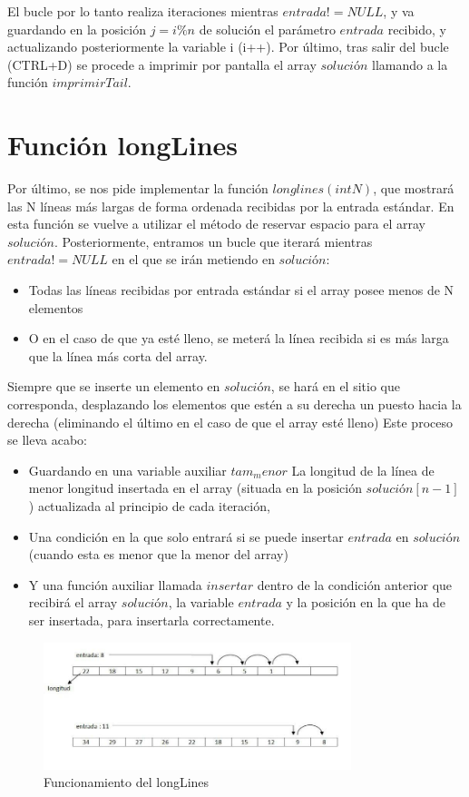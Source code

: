 El bucle por lo tanto realiza iteraciones mientras $entrada != NULL$, y va guardando en la posición $j=i\%n$ de solución el parámetro $entrada$ recibido, y actualizando posteriormente la variable i (i++).
Por último, tras salir del bucle (CTRL+D) se procede a imprimir por pantalla el array $solución$ llamando a la función $imprimirTail$.
\section{Función longLines}
Por último, se nos pide implementar la función $longlines(int N)$, que mostrará las N líneas más largas de forma ordenada recibidas por la entrada estándar.
En esta función se vuelve a utilizar el método de reservar espacio para el array $solución$. Posteriormente, entramos un bucle que iterará mientras $entrada != NULL$ en el que se irán metiendo en $solución$:
\begin{itemize}
\item Todas las líneas recibidas por entrada estándar si el array posee menos de N elementos
\item O en el caso de que ya esté lleno, se meterá la línea recibida si es más larga que la línea más corta del array.
\end{itemize}
Siempre que se inserte un elemento en $solución$, se hará en el sitio que corresponda, desplazando los elementos que estén a su derecha un puesto hacia la derecha (eliminando el último en el caso de que el array esté lleno)
Este proceso se lleva acabo:
\begin{itemize}
\item Guardando en una variable auxiliar $tam_menor$ La longitud de la línea de menor longitud insertada en el array (situada en la posición $solución[n-1]$) actualizada al principio de cada iteración,
\item Una condición en la que solo entrará si se puede insertar $entrada$ en $solución$ (cuando esta es menor que la menor del array)
\item Y una función auxiliar llamada $insertar$ dentro de la condición anterior que recibirá el array $solución$, la variable $entrada$ y la posición en la que ha de ser insertada, para insertarla correctamente.
\end{itemize}
\begin{figure}[htb]
\begin{center}
\centering
  \includegraphics[width=0.8\textwidth]{./img_2}
  \caption{Funcionamiento del longLines}
  \label{fig:Funcionamiento del longLines}
\end{center}
\end{figure} 

